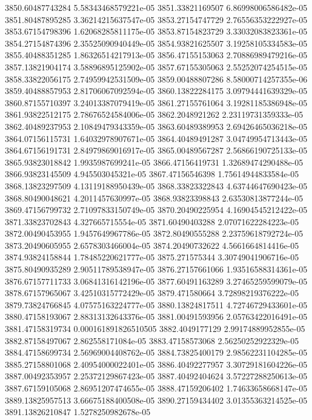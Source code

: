 {3850.60487743284 5.58343468579221e-05
3851.33821169507 6.86998006586482e-05
3851.80487895285 3.36214215637547e-05
3853.27154747729 2.76556353222927e-05
3853.67154798396 1.62068285811175e-05
3853.87154823729 3.33032083823361e-05
3854.27154874396 2.35525090940449e-05
3854.93821625507 3.19258105334583e-05
3855.40488351285 1.86326514217913e-05
3856.47155153063 2.70886989479216e-05
3857.13821904174 3.58896895125902e-05
3857.67155305063 2.55252074254515e-05
3858.33822056175 2.74959942531509e-05
3859.00488807286 8.58000714257355e-06
3859.40488857953 2.81706067092594e-05
3860.13822284175 3.09794441639329e-05
3860.87155710397 3.24013387079419e-05
3861.27155761064 3.19281185386948e-05
3861.93822512175 2.78676524584006e-05
3862.2048921262 2.23119731359333e-05
3862.40489237953 2.10849479343359e-05
3863.60489389953 2.69426465036218e-05
3864.07156115731 1.64032978907671e-05
3864.40489491287 3.04749954713443e-05
3864.67156191731 2.84979869016917e-05
3865.00489567287 2.56866190725133e-05
3865.93823018842 1.9935987699241e-05
3866.47156419731 1.32689474290488e-05
3866.93823145509 4.945503045321e-05
3867.47156546398 1.75614944833584e-05
3868.13823297509 4.13119188950439e-05
3868.33823322843 4.63744647690423e-05
3868.80490048621 4.2011457630997e-05
3868.93823398843 2.63530813877244e-05
3869.47156799732 2.71097833150749e-05
3870.20490225954 4.16904545212422e-05
3871.33823702843 4.327665715554e-05
3871.60490403288 2.07071622284223e-05
3872.00490453955 1.9457649967786e-05
3872.80490555288 2.23759618792724e-05
3873.20490605955 2.6578303466004e-05
3874.20490732622 4.5661664814416e-05
3874.93824158844 1.78485220621777e-05
3875.271575344 3.30749041906716e-05
3875.80490935289 2.90511789538947e-05
3876.27157661066 1.93516588314361e-05
3876.67157711733 3.06841316142196e-05
3877.60491163289 3.27465259599079e-05
3878.67157965067 3.42510315772429e-05
3879.471580664 3.72898219376222e-05
3879.73824766845 4.07575163224777e-05
3880.13824817511 4.72746729433601e-05
3880.47158193067 2.88313132643376e-05
3881.00491593956 2.05763422016491e-05
3881.47158319734 0.000161891826510505
3882.4049177129 2.99174889952855e-05
3882.87158497067 2.862558171084e-05
3883.47158573068 2.56250252922329e-05
3884.47158699734 2.56969004408762e-05
3884.73825400179 2.98562231104285e-05
3885.27158801068 2.40954000022401e-05
3886.40492277957 3.30729181604226e-05
3887.00492353957 2.25372129867423e-05
3887.40492404624 3.57227288250613e-05
3887.67159105068 2.86951207474655e-05
3888.47159206402 1.74633658668147e-05
3889.13825957513 3.66675188400508e-05
3890.27159434402 3.01355363214525e-05
3891.13826210847 1.5278250982678e-05
}
